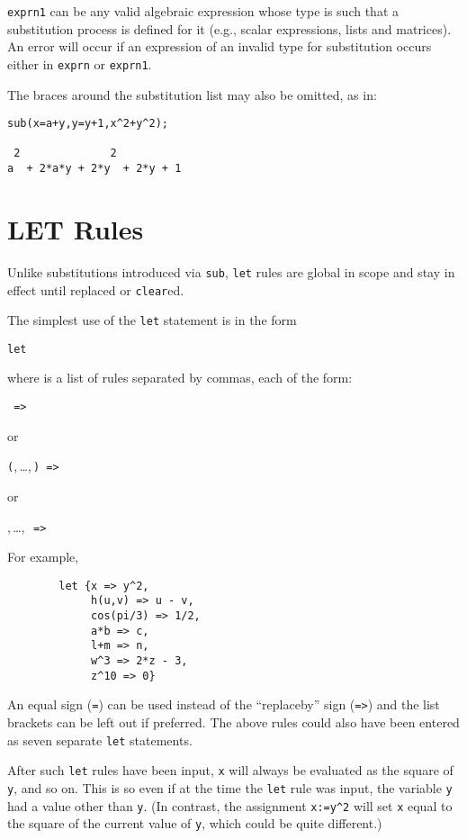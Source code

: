 \texttt{exprn1} can be any valid algebraic expression whose type is such that
a substitution process is defined for it (e.g., scalar expressions, lists
and matrices).  An error will occur if an expression of an invalid type
for substitution occurs either in \texttt{exprn} or \texttt{exprn1}.

The braces around the substitution list may also be omitted, as in:
\begin{verbatim}
sub(x=a+y,y=y+1,x^2+y^2);

 2              2
a  + 2*a*y + 2*y  + 2*y + 1
\end{verbatim}

\section{LET Rules}
\hypertarget{command:LET}{}
\hypertarget{reserved:impliesop}{}
Unlike substitutions introduced via \texttt{sub}, \texttt{let}
rules are global in scope and stay in effect until replaced or \texttt{clear}ed.

The simplest use of the \texttt{let} statement is in the form
\begin{syntax}
  \texttt{let }
\end{syntax}
where  is a list of rules separated by commas, each
of the form:
\begin{syntax}
  \texttt{ => }
\end{syntax}
or
\begin{syntax}
  \texttt{(},\,\dots,\,\texttt{)
    => }
\end{syntax}
or
\begin{syntax}
  ,\,\dots,\,\texttt{
    => }
\end{syntax}
For example,
\begin{verbatim}
        let {x => y^2,
             h(u,v) => u - v,
             cos(pi/3) => 1/2,
             a*b => c,
             l+m => n,
             w^3 => 2*z - 3,
             z^10 => 0}
\end{verbatim}
An equal sign (\texttt{=}) can be used instead of the ``replaceby''
sign (\texttt{=>}) and the list brackets can be left out if preferred.
The above rules could also have been entered as seven separate
\texttt{let} statements.

After such \texttt{let} rules have been input, \texttt{x} will always be
evaluated as the square of \texttt{y}, and so on.  This is so even if at the
time the \texttt{let} rule was input, the variable \texttt{y} had a value other
than \texttt{y}. (In contrast, the assignment \texttt{x:=y\textasciicircum2}
will set \texttt{x}
equal to the square of the current value of \texttt{y}, which could be quite
different.)

